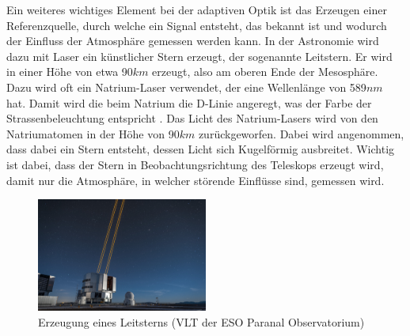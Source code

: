 \begin{refsection}
Ein weiteres wichtiges Element bei der adaptiven Optik ist das Erzeugen einer Referenzquelle, durch welche ein Signal entsteht, das bekannt ist und wodurch der Einfluss der Atmosphäre gemessen werden kann. In der Astronomie wird dazu mit Laser ein künstlicher Stern erzeugt, der sogenannte Leitstern. Er wird in einer Höhe von etwa 90$km$ erzeugt, also am oberen Ende der Mesosphäre. Dazu wird oft ein Natrium-Laser verwendet, der eine Wellenlänge von 589$nm$ hat. Damit wird die beim Natrium die D-Linie angeregt, was der Farbe der Strassenbeleuchtung entspricht . Das Licht des Natrium-Lasers wird von den Natriumatomen in der Höhe von 90$km$ zurückgeworfen. Dabei wird angenommen, dass dabei ein Stern entsteht, dessen Licht sich Kugelförmig ausbreitet. Wichtig ist dabei, dass der Stern in Beobachtungsrichtung des Teleskops erzeugt wird, damit nur die Atmosphäre, in welcher störende Einflüsse sind, gemessen wird. 


\begin{figure}
  \centering
  \includegraphics[width=0.5\textwidth]{adaptiv/images/Leitstern}
  \caption{Erzeugung eines Leitsterns (VLT der ESO Paranal Observatorium)
    \cite{eso:leitstern}}
  \label{fig:leitstern}
\end{figure}


\end{refsection}
